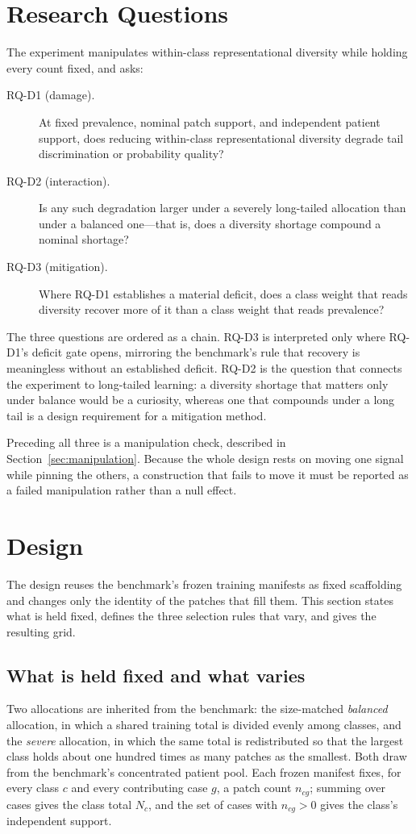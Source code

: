 \documentclass[11pt]{article}
\begin{document}
\section{Research Questions}
\label{sec:rqs}
The experiment manipulates within-class representational diversity while holding every count fixed, and asks:
\begin{description}
  \item[RQ-D1 (damage).] At fixed prevalence, nominal patch support, and independent patient support, does reducing within-class representational diversity degrade tail discrimination or probability quality?
  \item[RQ-D2 (interaction).] Is any such degradation larger under a severely long-tailed allocation than under a balanced one---that is, does a diversity shortage compound a nominal shortage?
  \item[RQ-D3 (mitigation).] Where RQ-D1 establishes a material deficit, does a class weight that reads diversity recover more of it than a class weight that reads prevalence?
\end{description}
\noindent The three questions are ordered as a chain. RQ-D3 is interpreted only where RQ-D1's deficit gate opens, mirroring the benchmark's rule that recovery is meaningless without an established deficit. RQ-D2 is the question that connects the experiment to long-tailed learning: a diversity shortage that matters only under balance would be a curiosity, whereas one that compounds under a long tail is a design requirement for a mitigation method.

Preceding all three is a manipulation check, described in Section~\ref{sec:manipulation}. Because the whole design rests on moving one signal while pinning the others, a construction that fails to move it must be reported as a failed manipulation rather than a null effect.

\section{Design}
\label{sec:design}
The design reuses the benchmark's frozen training manifests as fixed scaffolding and changes only the identity of the patches that fill them. This section states what is held fixed, defines the three selection rules that vary, and gives the resulting grid.

\subsection{What is held fixed and what varies}
\label{sec:fixed-varied}
Two allocations are inherited from the benchmark: the size-matched \emph{balanced} allocation, in which a shared training total is divided evenly among classes, and the \emph{severe} allocation, in which the same total is redistributed so that the largest class holds about one hundred times as many patches as the smallest. Both draw from the benchmark's concentrated patient pool. Each frozen manifest fixes, for every class $c$ and every contributing case $g$, a patch count $n_{cg}$; summing over cases gives the class total $N_c$, and the set of cases with $n_{cg}>0$ gives the class's independent support.
\end{document}
